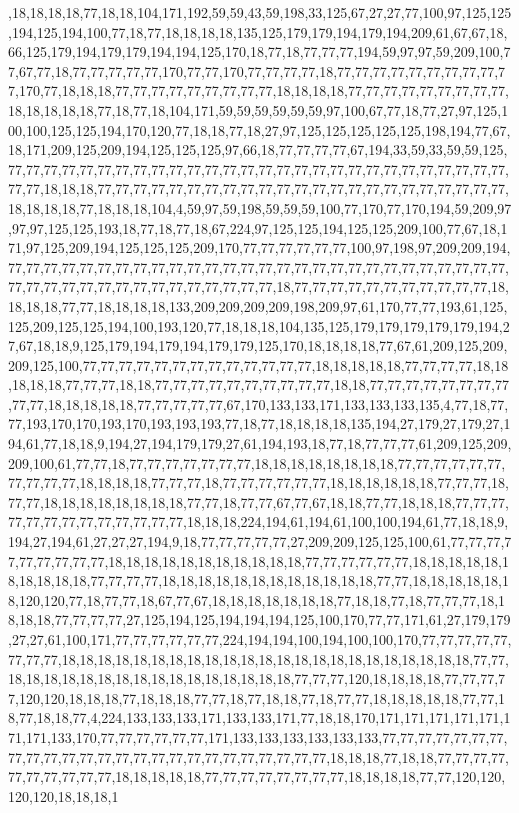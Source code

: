 ,18,18,18,18,77,18,18,104,171,192,59,59,43,59,198,33,125,67,27,27,77,100,97,125,125,194,125,194,100,77,18,77,18,18,18,18,135,125,179,179,194,179,194,209,61,67,67,18,66,125,179,194,179,179,194,194,125,170,18,77,18,77,77,77,194,59,97,97,59,209,100,77,67,77,18,77,77,77,77,77,170,77,77,170,77,77,77,77,18,77,77,77,77,77,77,77,77,77,77,170,77,18,18,18,77,77,77,77,77,77,77,77,77,18,18,18,18,77,77,77,77,77,77,77,77,77,18,18,18,18,18,77,18,77,18,104,171,59,59,59,59,59,59,97,100,67,77,18,77,27,97,125,100,100,125,125,194,170,120,77,18,18,77,18,27,97,125,125,125,125,125,198,194,77,67,18,171,209,125,209,194,125,125,125,97,66,18,77,77,77,77,67,194,33,59,33,59,59,125,77,77,77,77,77,77,77,77,77,77,77,77,77,77,77,77,77,77,77,77,77,77,77,77,77,77,77,77,77,77,18,18,18,77,77,77,77,77,77,77,77,77,77,77,77,77,77,77,77,77,77,77,77,77,77,77,18,18,18,18,77,18,18,18,104,4,59,97,59,198,59,59,59,100,77,170,77,170,194,59,209,97,97,97,125,125,193,18,77,18,77,18,67,224,97,125,125,194,125,125,209,100,77,67,18,171,97,125,209,194,125,125,125,209,170,77,77,77,77,77,77,100,97,198,97,209,209,194,77,77,77,77,77,77,77,77,77,77,77,77,77,77,77,77,77,77,77,77,77,77,77,77,77,77,77,77,77,77,77,77,77,77,77,77,77,77,77,77,77,77,77,18,77,77,77,77,77,77,77,77,77,77,77,18,18,18,18,77,77,18,18,18,18,133,209,209,209,209,198,209,97,61,170,77,77,193,61,125,125,209,125,125,194,100,193,120,77,18,18,18,104,135,125,179,179,179,179,179,194,27,67,18,18,9,125,179,194,179,194,179,179,125,170,18,18,18,18,77,67,61,209,125,209,209,125,100,77,77,77,77,77,77,77,77,77,77,77,77,77,18,18,18,18,18,77,77,77,77,18,18,18,18,18,77,77,77,18,18,77,77,77,77,77,77,77,77,77,77,18,18,77,77,77,77,77,77,77,77,77,77,18,18,18,18,18,77,77,77,77,77,67,170,133,133,171,133,133,133,135,4,77,18,77,77,193,170,170,193,170,193,193,193,77,18,77,18,18,18,18,135,194,27,179,27,179,27,194,61,77,18,18,9,194,27,194,179,179,27,61,194,193,18,77,18,77,77,77,61,209,125,209,209,100,61,77,77,18,77,77,77,77,77,77,77,18,18,18,18,18,18,18,18,77,77,77,77,77,77,77,77,77,77,18,18,18,18,77,77,77,18,77,77,77,77,77,77,18,18,18,18,18,18,77,77,77,18,77,77,18,18,18,18,18,18,18,18,77,77,18,77,77,67,77,67,18,18,77,77,18,18,18,77,77,77,77,77,77,77,77,77,77,77,77,77,18,18,18,224,194,61,194,61,100,100,194,61,77,18,18,9,194,27,194,61,27,27,27,194,9,18,77,77,77,77,77,27,209,209,125,125,100,61,77,77,77,77,77,77,77,77,77,18,18,18,18,18,18,18,18,18,18,18,77,77,77,77,77,77,18,18,18,18,18,18,18,18,18,18,77,77,77,77,18,18,18,18,18,18,18,18,18,18,18,18,77,77,18,18,18,18,18,18,120,120,77,18,77,77,18,67,77,67,18,18,18,18,18,18,18,77,18,18,77,18,77,77,77,18,18,18,18,77,77,77,77,27,125,194,125,194,194,194,125,100,170,77,77,171,61,27,179,179,27,27,61,100,171,77,77,77,77,77,77,224,194,194,100,194,100,100,170,77,77,77,77,77,77,77,77,18,18,18,18,18,18,18,18,18,18,18,18,18,18,18,18,18,18,18,18,18,18,18,77,77,18,18,18,18,18,18,18,18,18,18,18,18,18,18,18,18,77,77,77,120,18,18,18,18,77,77,77,77,120,120,18,18,18,77,18,18,18,77,77,18,77,18,18,77,18,77,77,18,18,18,18,18,77,77,18,77,18,18,77,4,224,133,133,133,171,133,133,171,77,18,18,170,171,171,171,171,171,171,171,133,170,77,77,77,77,77,77,171,133,133,133,133,133,133,77,77,77,77,77,77,77,77,77,77,77,77,77,77,77,77,77,77,77,77,77,77,77,77,77,18,18,18,77,18,18,77,77,77,77,77,77,77,77,77,77,18,18,18,18,18,77,77,77,77,77,77,77,77,18,18,18,18,77,77,120,120,120,120,18,18,18,1